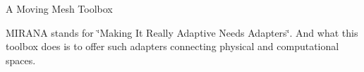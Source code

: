 A Moving Mesh Toolbox



M\+I\+R\+A\+N\+A stands for \char`\"{}\+Making It Really Adaptive Needs Adapters\char`\"{}. And what this toolbox does is to offer such adapters connecting physical and computational spaces. 